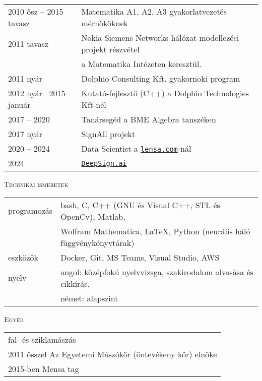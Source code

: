 \documentclass[12pt]{article}
\begin{document}
       \begin{tabular}{p{4cm}l}
	       2010 ősz -- 2015 tavasz & Matematika A1, A2, A3 gyakorlatvezetés mérnököknek\\
           2011 tavasz  & Nokia Siemens Networks hálózat modellezési projekt részvétel\\ & a Matematika Intézeten keresztül. \\
		   2011 nyár    & Dolphio Consulting Kft. gyakornoki program\\
		   2012 nyár-- 2015 január & Kutató-fejlesztő (C++) a Dolphio Technologies Kft-nél \\
           2017 -- 2020 & Tanársegéd a BME Algebra tanszéken \\
           2017 nyár & SignAll projekt \\
           2020 -- 2024 & Data Scientist a \href{https://lensa.com/}{\texttt{lensa.com}}-nál \\
	   2024 --      & \href{https://deepsign.ai/}{\texttt{DeepSign.ai}}
       \end{tabular}
 
 \textsc{Technikai ismeretek}

    \begin{tabular}{p{3cm}l}
	       programozás & bash, C, C++ (GNU és Visual C++, STL és OpenCv), Matlab, \\
                             & Wolfram Mathematica, \LaTeX, Python (neurális háló függvénykönyvtárak) \\
           eszközök & Docker, Git, MS Teams, Visual Studio, AWS \\
           nyelv & angol: középfokú nyelvvizsga, szakirodalom olvasása és cikkírás, \\
                 & német: alapszint
   \end{tabular}
   
 \textsc{Egyéb}
 
    \begin{tabular}{l}
        fal- és sziklamászás\\
        2011 ősszel Az Egyetemi Mászókör (öntevékeny kör) elnöke \\
        2015-ben Mensa tag
   \end{tabular}
\end{document}
